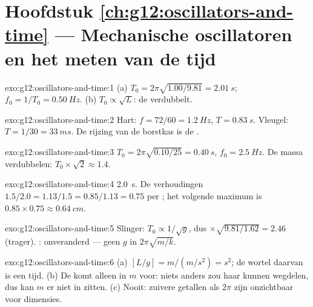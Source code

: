 \section*{Hoofdstuk \ref{ch:g12:oscillators-and-time} --- Mechanische oscillatoren en het meten van de tijd}

\begin{solution}{exo:g12:oscillators-and-time:1}
(a) $T_0 = 2\pi\sqrt{1.00/9.81} = \qty{2.01}{s}$;
$f_0 = 1/T_0 = \qty{0.50}{Hz}$. (b) $T_0 \propto \sqrt{L}$: de 
verdubbelt.
\end{solution}

\begin{solution}{exo:g12:oscillators-and-time:2}
Hart: $f = 72/60 = \qty{1.2}{Hz}$, $T = \qty{0.83}{s}$. Vleugel:
$T = 1/30 = \qty{33}{ms}$. De rijzing van de borstkas is de
\emph{}.
\end{solution}

\begin{solution}{exo:g12:oscillators-and-time:3}
$T_0 = 2\pi\sqrt{0.10/25} = \qty{0.40}{s}$, $f_0 = \qty{2.5}{Hz}$. De massa
verdubbelen: $T_0 \times \sqrt{2} \approx 1.4$.
\end{solution}

\begin{solution}{exo:g12:oscillators-and-time:4}
 \qty{2.0}{s}. De verhoudingen $1.5/2.0 = 1.13/1.5 = 0.85/1.13
= 0.75$ per ; het volgende maximum is $0.85 \times 0.75 \approx
\qty{0.64}{cm}$.
\end{solution}

\begin{solution}{exo:g12:oscillators-and-time:5}
Slinger: $T_0 \propto 1/\sqrt{g}$, dus $\times\sqrt{9.81/1.62} = 2.46$
(trager). : onveranderd --- geen $g$ in $2\pi\sqrt{m/k}$.
\end{solution}

\begin{solution}{exo:g12:oscillators-and-time:6}
(a) $[L/g] = \unit{m}/(\unit{m/s^2}) = \unit{s^2}$; de wortel daarvan is een
tijd. (b) De  komt alleen in $m$ voor: niets anders zou haar kunnen
wegdelen, dus kan $m$ er niet in zitten. (c) Nooit: zuivere getallen als
$2\pi$ zijn onzichtbaar voor dimensies.
\end{solution}

